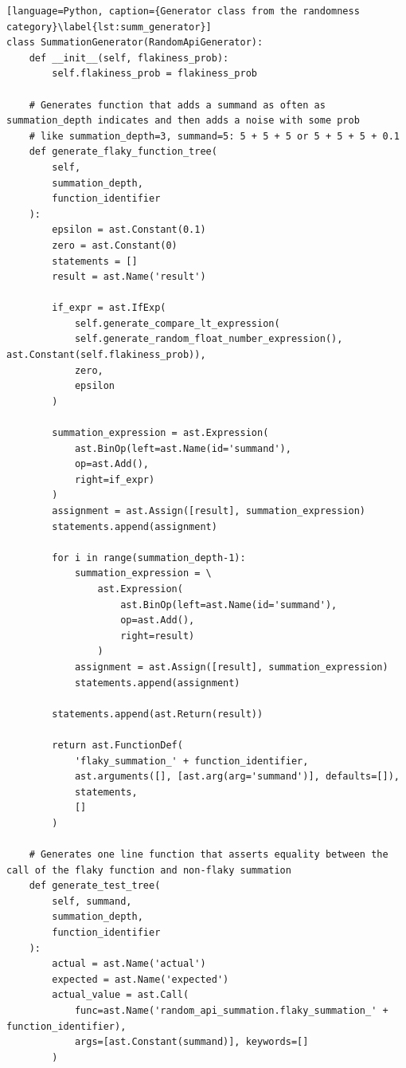 \documentclass[
fancyheadings, %
%
%
]{stsreprt}
\begin{document}
\begin{lstlisting}[language=Python, caption={Generator class from the randomness category}\label{lst:summ_generator}]
class SummationGenerator(RandomApiGenerator):
    def __init__(self, flakiness_prob):
        self.flakiness_prob = flakiness_prob

    # Generates function that adds a summand as often as summation_depth indicates and then adds a noise with some prob
    # like summation_depth=3, summand=5: 5 + 5 + 5 or 5 + 5 + 5 + 0.1
    def generate_flaky_function_tree(
        self, 
        summation_depth, 
        function_identifier
    ):
        epsilon = ast.Constant(0.1)
        zero = ast.Constant(0)
        statements = []
        result = ast.Name('result')

        if_expr = ast.IfExp(
            self.generate_compare_lt_expression(
            self.generate_random_float_number_expression(), ast.Constant(self.flakiness_prob)),
            zero,
            epsilon
        )

        summation_expression = ast.Expression(
            ast.BinOp(left=ast.Name(id='summand'), 
            op=ast.Add(), 
            right=if_expr)
        )
        assignment = ast.Assign([result], summation_expression)
        statements.append(assignment)

        for i in range(summation_depth-1):
            summation_expression = \
                ast.Expression(
                    ast.BinOp(left=ast.Name(id='summand'),
                    op=ast.Add(), 
                    right=result)
                )
            assignment = ast.Assign([result], summation_expression)
            statements.append(assignment)

        statements.append(ast.Return(result))

        return ast.FunctionDef(
            'flaky_summation_' + function_identifier,
            ast.arguments([], [ast.arg(arg='summand')], defaults=[]),
            statements,
            []
        )

    # Generates one line function that asserts equality between the call of the flaky function and non-flaky summation
    def generate_test_tree(
        self, summand, 
        summation_depth, 
        function_identifier
    ):
        actual = ast.Name('actual')
        expected = ast.Name('expected')
        actual_value = ast.Call(
            func=ast.Name('random_api_summation.flaky_summation_' + function_identifier), 
            args=[ast.Constant(summand)], keywords=[]
        )


\end{lstlisting}
\end{document}
